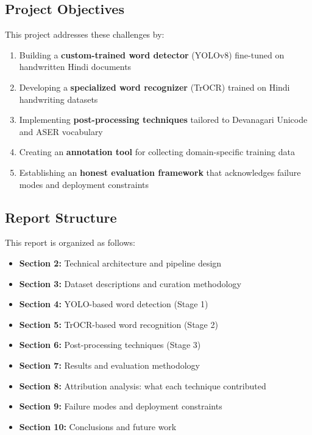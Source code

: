 \documentclass[14pt,a4paper]{article}
\begin{document}
\subsection{Project Objectives}

This project addresses these challenges by:
\begin{enumerate}
    \item Building a \textbf{custom-trained word detector} (YOLOv8) fine-tuned on handwritten Hindi documents
    \item Developing a \textbf{specialized word recognizer} (TrOCR) trained on Hindi handwriting datasets
    \item Implementing \textbf{post-processing techniques} tailored to Devanagari Unicode and ASER vocabulary
    \item Creating an \textbf{annotation tool} for collecting domain-specific training data
    \item Establishing an \textbf{honest evaluation framework} that acknowledges failure modes and deployment constraints
\end{enumerate}

\subsection{Report Structure}

This report is organized as follows:
\begin{itemize}
    \item \textbf{Section 2:} Technical architecture and pipeline design
    \item \textbf{Section 3:} Dataset descriptions and curation methodology
    \item \textbf{Section 4:} YOLO-based word detection (Stage 1)
    \item \textbf{Section 5:} TrOCR-based word recognition (Stage 2)
    \item \textbf{Section 6:} Post-processing techniques (Stage 3)
    \item \textbf{Section 7:} Results and evaluation methodology
    \item \textbf{Section 8:} Attribution analysis: what each technique contributed
    \item \textbf{Section 9:} Failure modes and deployment constraints
    \item \textbf{Section 10:} Conclusions and future work
\end{itemize}
\newpage
\end{document}
